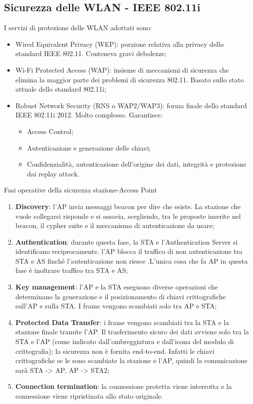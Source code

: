 \subsection{Sicurezza delle WLAN - IEEE 802.11i}

I servizi di protezione delle WLAN adottati sono:
\begin{itemize}
    \item Wired Equivalent Privacy (WEP): porzione relativa alla privacy dello standard IEEE 802.11. Conteneva gravi debolezze;
	\item Wi-Fi Protected Access (WAP): insieme di meccanismi di sicurezza che elimina la maggior parte dei problemi di sicurezza 802.11. Basato sullo stato attuale dello standard 802.11i;
	\item Robust Network Security (RNS o WAP2/WAP3): forma finale dello standard IEEE 802.11i 2012. Molto complesso. Garantisce:
	\begin{itemize}
	    \item Access Control;
		\item Autenticazione e generazione delle chiavi;
		\item Confidenzialità, autenticazione dell'origine dei dati, integrità e protezione dai replay attack.
	\end{itemize}
\end{itemize}

Fasi operative della sicurezza stazione-Access Point
\begin{enumerate}
    \item \textbf{Discovery}: l'AP invia messaggi beacon per dire che esiste. La stazione che vuole collegarsi risponde e si associa, scegliendo, tra le proposte inserite nel beacon, il cypher suite e il meccanismo di autenticazione da usare;
	\item \textbf{Authentication}: durante questa fase, la STA e l'Authentication Server si identificano reciprocamente. l'AP blocca il traffico di non autenticazione tra STA e AS finché l'autenticazione non riesce .L'unica cosa che fa AP in questa fase è inoltrare traffico tra STA e AS;
	\item \textbf{Key management}: l'AP e la STA eseguono diverse operazioni che determinano la generazione e il posizionamento di chiavi crittografiche sull'AP e sulla STA. I frame vengono scambiati solo tra AP e STA;
	\item \textbf{Protected Data Transfer}: i frame vengono scambiati tra la STA e la stazione finale tramite l'AP. Il trasferimento sicuro dei dati avviene solo tra la STA e l'AP (come indicato dall'ombreggiatura e dall'icona del modulo di crittografia); la sicurezza non è fornita end-to-end. Infatti le chiavi crittografiche se le sono scambiate la stazione e l'AP, quindi la comunicazione sarà STA -> AP, AP -> STA2;
	\item \textbf{Connection termination}: la connessione protetta viene interrotta e la connessione viene ripristinata allo stato originale.
\end{enumerate}

